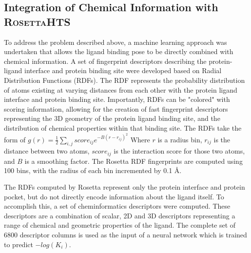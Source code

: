 \documentclass[11pt, oneside]{article}   	%
\newcommand{\rhts}{\textsc{RosettaHTS}\ }
\begin{document}
\subsection{Integration of Chemical Information with \rhts}
To address the problem described above, a machine learning approach was undertaken that allows the ligand binding pose to be directly combined with chemical information.
A set of fingerprint descriptors describing the protein-ligand interface and protein binding site were developed based on Radial Distribution Functions (RDFs).  
The RDF represents the probability distribution of atoms existing at varying distances from each other with the protein ligand interface and protein binding site.  
Importantly, RDFs can be "colored" with scoring information, allowing for the creation of fast fingerprint descriptors representing the 3D geometry of the protein ligand binding site, and the distribution of chemical properties within that binding site.  
The RDFs take the form of $g(r) =\frac{1}{2}\sum\limits_{i,j}score_{ij}e^{-B(r-r_{ij})^2}$ Where $r$ is a radius bin, $r_{ij}$ is the distance between two atoms, $score_{ij}$ is the interaction score for those two atoms, and $B$ is a smoothing factor.  
The Rosetta RDF fingerprints are computed using 100 bins, with the radius of each bin incremented by 0.1 \AA.  

The RDFs computed by Rosetta represent only the protein interface and protein pocket, but do not directly encode information about the ligand itself.  
To accomplish this, a set of cheminformatics descriptors\citep{Mueller:2012gn} were computed. 
These descriptors are a combination of scalar, 2D and 3D descriptors representing a range of chemical and geometric properties of the ligand. 
The complete set of 6800 descriptor columns is used as the input of a neural network which is trained to predict $-log(K_{i})$. 
\end{document}
